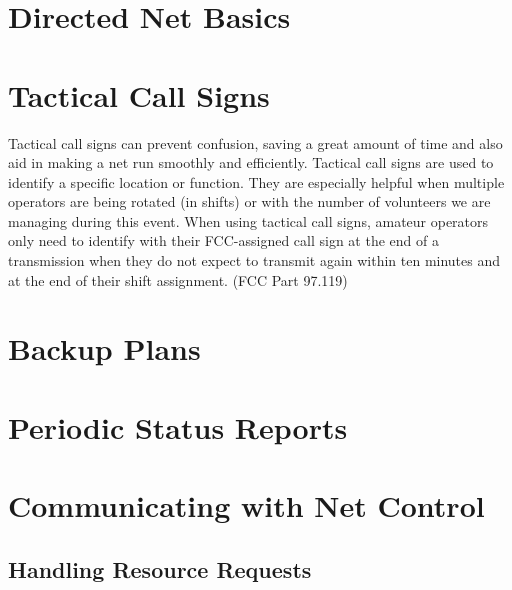 \documentclass[pdflatex,letterpaper,twoside,12pt]{book}
\begin{document}
\section{Directed Net Basics}


\section{Tactical Call Signs}

Tactical call signs can prevent confusion, saving a great amount of time and also aid in making a net run smoothly and efficiently.  Tactical call signs are used to identify a specific location or function.  They are especially helpful when multiple operators are being rotated (in shifts) or with the number of volunteers we are managing during this event.  When using tactical call signs, amateur operators only need to identify with their FCC-assigned call sign at the end of a transmission when they do not expect to transmit again within ten minutes and at the end of their shift assignment. (FCC Part 97.119) 


\section{Backup Plans}


\section{Periodic Status Reports}


\section{Communicating with Net Control}

\subsection{Handling Resource Requests}
\end{document}
